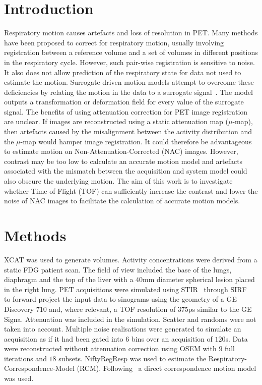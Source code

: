 \documentclass[portrait,color=UCLburgundy,margin=2cm]{uclposter}
\begin{document}
\begin{multicols}{4}
\large

\section*{Introduction}
Respiratory motion causes artefacts and loss of resolution in PET. Many methods have been proposed to correct for respiratory motion, usually involving registration between a reference volume and a set of volumes in different positions in the respiratory cycle. However, such pair-wise registration is sensitive to noise. It also does not allow prediction of the respiratory state for data not used to estimate the motion. Surrogate driven motion models attempt to overcome these deficiencies by relating the motion in the data to a surrogate signal~\cite{McClelland2013}. The model outputs a transformation or deformation field for every value of the surrogate signal. The benefits of using attenuation correction for PET image registration are unclear. If images are reconstructed using a static attenuation map ($\mu$-map), then artefacts caused by the misalignment between the activity distribution and the $\mu$-map would hamper image registration. It could therefore be advantageous to estimate motion on Non-Attenuation-Corrected (NAC) images. However, contrast may be too low to calculate an accurate motion model and artefacts associated with the mismatch between the acquisition and system model could also obscure the underlying motion. The aim of this work is to investigate whether Time-of-Flight (TOF) can sufficiently increase the contrast and lower the noise of NAC images to facilitate the calculation of accurate motion models.

\section*{Methods}
XCAT was used to generate volumes. Activity concentrations were derived from a static FDG patient scan. The field of view included the base of the lungs, diaphragm and the top of the liver with a $40$mm diameter spherical lesion placed in the right lung. PET acquisitions were simulated using STIR~\cite{Thielemans2012,Efthimiou2018} through SIRF~\cite{Ovtchinnikov2017} to forward project the input data to sinograms using the geometry of a GE Discovery 710 and, where relevant, a TOF resolution of $375$ps similar to the GE Signa. Attenuation was included in the simulation. Scatter and randoms were not taken into account. Multiple noise realisations were generated to simulate an acquisition as if it had been gated into $6$ bins over an acquisition of $120$s. Data were reconstructed without attenuation correction using OSEM with $9$ full iterations and $18$ subsets. NiftyRegResp was used to estimate the Respiratory-Correspondence-Model (RCM). Following~\cite{McClelland2013} a direct correspondence motion model was used.

\end{multicols}
\end{document}
